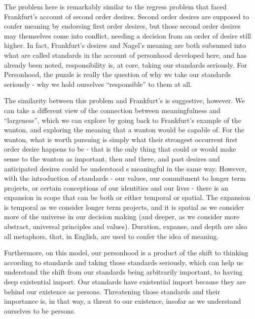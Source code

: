 \documentclass[phd,12pt,oneside,paper=letterpaper]{ubcthesis}
\begin{document}
The problem here is remarkably similar to the regress problem that faced Frankfurt's account of second order desires. Second order desires are supposed to confer meaning by endorsing first order desires, but those second order desires may themselves come into conflict, needing a decision from an order of desire still higher. In fact, Frankfurt's desires and Nagel's meaning are both subsumed into what are called standards in the account of personhood developed here, and has already been noted, responsibility is, at core, taking our standards seriously. For Personhood, the puzzle is really the question of why we take our standards seriously - why we hold ourselves ``responsible'' to them at all.

The similarity between this problem and Frankfurt's is suggestive, however. We can take a different view of the connection between meaningfulness and ``largeness'', which we can explore by going back to Frankfurt's example of the wanton, and exploring the meaning that a wanton would be capable of. For the wanton, what is worth pursuing is simply what their strongest occurrent first order desire happens to be - that is the only thing that could or would make sense to the wanton as important, then and there, and past desires and anticipated desires could be understood s meaningful in the same way. However, with the introduction of standards - our values, our commitment to longer term projects, or certain conceptions of our identities and our lives - there is an expansion in scope that can be both or either temporal or spatial. The expansion is temporal as we consider longer term projects, and it is spatial as we consider more of the universe in our decision making (and deeper, as we consider more abstract, universal principles and values). Duration, expanse, and depth are also all metaphors, that, in English, are used to confer the idea of meaning.

Furthermore, on this model, our personhood is a product of the shift to thinking according to standards and taking those standards seriously, which can help us understand the shift from our standards being arbitrarily important, to having deep existential import. Our standards have existential import because they are behind our existence as persons. Threatening those standards and their importance is, in that way, a threat to our existence, insofar as we understand ourselves to be persons. 
\end{document}
